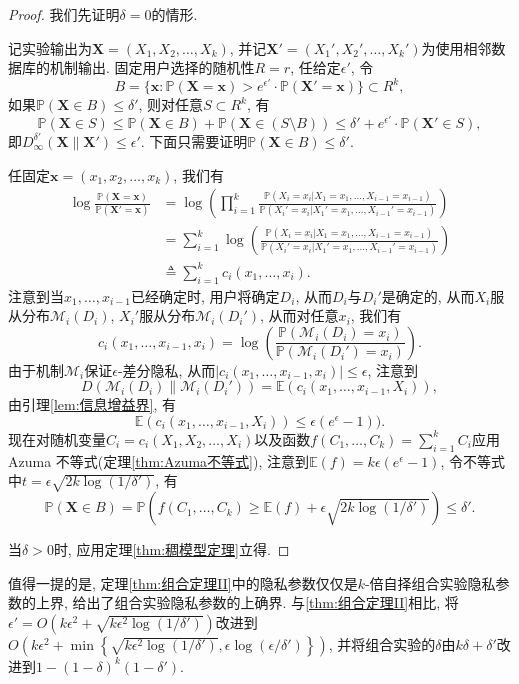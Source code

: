 \begin{proof}
  我们先证明$\delta = 0$的情形.
  
  记实验输出为$\mathbf{X} = (X_1, X_2, \dots, X_k)$, 并记$\mathbf{X}' = (X_1', X_2', \dots, X_k')$为使用相邻数据库的机制输出. 固定用户选择的随机性$R = r$, 任给定$\epsilon'$, 令
  \[
    B = \{\mathbf{x}\colon\mathbb P(\mathbf{X} = \mathbf{x}) > e^{\epsilon'}\cdot\mathbb P(\mathbf{X}' = \mathbf{x})\} \subset R^k,
  \]
  如果$\mathbb P(\mathbf{X} \in B) \le \delta'$, 则对任意$S \subset R^k$, 有
  \[
    \mathbb P(\mathbf{X} \in S) \le \mathbb P(\mathbf{X} \in B) + \mathbb P\left(\mathbf{X} \in \left(S\setminus B\right)\right) \le \delta' + e^{\epsilon'}\cdot \mathbb P(\mathbf{X}' \in S), 
  \]
  即$D_\infty^{\delta'}(\mathbf{X}\|\mathbf{X}')\le\epsilon'$. 下面只需要证明$\mathbb P(\mathbf{X} \in B) \le \delta'$.
  
  任固定$\mathbf{x} = (x_1, x_2, \dots, x_k)$, 我们有
  \[
    \begin{split}
      \log\frac{\mathbb P(\mathbf{X} = \mathbf{x})}{\mathbb P(\mathbf{X}' = \mathbf{x})} &= \log\left( \prod_{i=1}^k \frac{\mathbb P(X_i = x_i|X_1 = x_1, \dots, X_{i-1} = x_{i-1})}{\mathbb P(X_i' = x_i|X_1' = x_1, \dots, X_{i-1}' = x_{i-1})}\right) \\
      &= \sum_{i=1}^k \log\left( \frac{\mathbb P(X_i = x_i|X_1 = x_1, \dots, X_{i-1} = x_{i-1})}{\mathbb P(X_i' = x_i|X_1' = x_1, \dots, X_{i-1}' = x_{i-1})}\right) \\
      &\triangleq \sum_{i=1}^k c_i(x_1, \dots, x_i).
    \end{split}
  \]
  注意到当$x_1, \dots, x_{i-1}$已经确定时, 用户将确定$D_i$, 从而$D_i$与$D_i'$是确定的, 从而$X_i$服从分布$\mathcal{M}_i(D_i)$, $X_i'$服从分布$\mathcal{M}_i(D_i')$, 从而对任意$x_i$, 我们有
  \[
    c_i(x_1, \dots, x_{i-1}, x_i) = \log\left( \frac{\mathbb P(\mathcal{M}_i(D_i) = x_i)}{\mathbb P(\mathcal{M}_i(D_i') = x_i)} \right).
  \]
  由于机制$\mathcal{M}_i$保证$\epsilon$-差分隐私, 从而$|c_i(x_1, \dots, x_{i-1}, x_i)| \le \epsilon$, 注意到
  \[
  D(\mathcal{M}_i(D_i)\|\mathcal{M}_i(D_i')) = \mathbb E(c_i(x_1, \dots, x_{i-1}, X_i)),
  \] 
  由引理\ref{lem:信息增益界}, 有
  \[
    \mathbb E(c_i(x_1, \dots, x_{i-1}, X_i)) \le \epsilon(e^\epsilon - 1)).
  \]
  现在对随机变量$C_i = c_i(X_1, X_2, \dots, X_i)$以及函数$f(C_1,\dots, C_k) = \sum_{i=1}^k C_i$应用 Azuma 不等式(定理\ref{thm:Azuma不等式}), 注意到$\mathbb E(f) = k\epsilon(e^\epsilon - 1)$, 令不等式中$t = \epsilon \sqrt{2k\log(1/\delta')}$, 有
  \[
    \mathbb P(\mathbf{X} \in B) = \mathbb P\left(f(C_1, \dots, C_k)\ge \mathbb E(f) + \epsilon\sqrt{2k\log(1/\delta')}\right) \le \delta'.
  \]
  
  当$\delta > 0$时, 应用定理\ref{thm:稠模型定理}立得.
\end{proof}
值得一提的是, 定理\ref{thm:组合定理II}中的隐私参数仅仅是$k$-倍自择组合实验隐私参数的上界, \parencite{oh2013composition} 给出了组合实验隐私参数的上确界. 与\ref{thm:组合定理II}相比, \parencite{oh2013composition}将$\epsilon' = O\left(k\epsilon^2 + \sqrt{k\epsilon^2\log(1/\delta')}\right)$改进到$O\left(k\epsilon^2 + \min\left\{\sqrt{k\epsilon^2\log(1/\delta')}, \epsilon\log(\epsilon/\delta')\right\}\right)$, 并将组合实验的$\delta$由$k\delta + \delta'$改进到$1 - (1-\delta)^k(1 - \delta')$.

